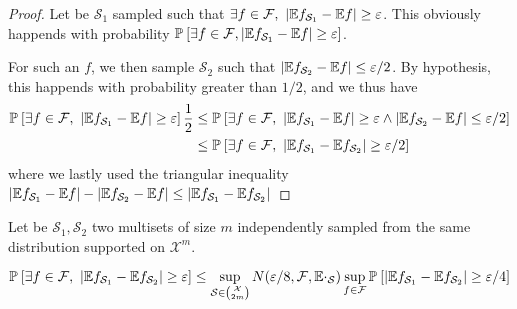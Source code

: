 \begin{proof}
	Let be $\mathcal{S}_1$ sampled such that $\exists f \in \mathcal{F},\ |\EE {f_{\mathcal{S}_1}} - \EE f| \geq \epsilon$. This obviously happends with probability $\mathbb{P}_{}\left[\exists f \in \mathcal{F}, |\mathbb{E}{f_{\mathcal{S}_1}} - \mathbb{E} f| \geq \varepsilon \right]$.

	For such an $f$, we then sample $\mathcal{S}_2$ such that $|\mathbb{E} {f_{\mathcal{S}_2}} -  \mathbb{E} f| \leq \varepsilon/2$. By hypothesis, this happends with probability greater than $1/2$, and we thus have
	\begin{align*}
		\mathbb{P}_{}\left[ \exists f \in \mathcal{F},\ \lvert \mathbb{E}{f_{\mathcal{S}_1}} - \mathbb{E} f \rvert \geq \varepsilon\right]
		\frac 1 2 
		&\leq \mathbb{P}_{}\left[\exists f \in \mathcal{F},\ \lvert \mathbb{E}{f_{\mathcal{S}_1}} - \mathbb{E} f \rvert \geq \varepsilon \wedge \lvert\mathbb{E}{f_{\mathcal{S}_2}} - \mathbb{E} f \rvert \leq \varepsilon/2 \right] \\
		&\leq \mathbb{P}_{}\left[\exists f \in \mathcal{F},\ \lvert \mathbb{E}{f_{\mathcal{S}_1}} - \mathbb{E}{f_{\mathcal{S}_2}} \rvert \geq \varepsilon/2 \right]
	\end{align*}
	where we lastly used the triangular inequality $ \lvert \mathbb{E}{f_{\mathcal{S}_1}} - \mathbb{E} f \rvert - \lvert\mathbb{E}{f_{\mathcal{S}_2}} - \mathbb{E} f \rvert \leq   \lvert \mathbb{E}{f_{\mathcal{S}_1}} - \mathbb{E}{f_{\mathcal{S}_2}} \rvert  $
\end{proof}



\begin{lemma}
	Let be $\mathcal{S}_1, \mathcal{S}_2$ two multisets of size $m$ independently sampled from the same distribution supported on $\mathcal{X}^m$. 
	

	\begin{equation}
		\PPP{}{\exists f \in \mathcal{F},\ \lvert \EE{f_{\mathcal{S}_1}} - \EE{f_{\mathcal{S}_2}} \rvert \geq \epsilon} \leq \sup_{\mathcal{S} \in \binom{\mathcal{X}}{2m} } N(\epsilon/8, \mathcal{F}, \EE \cdot_{\mathcal{S}}) \sup_{f \in \mathcal{F}} \PPP{}{\lvert \EE{f_{\mathcal{S}_1}} - \EE{f_{\mathcal{S}_2}} \rvert \geq \epsilon/4 }
	\end{equation}

\end{lemma}


